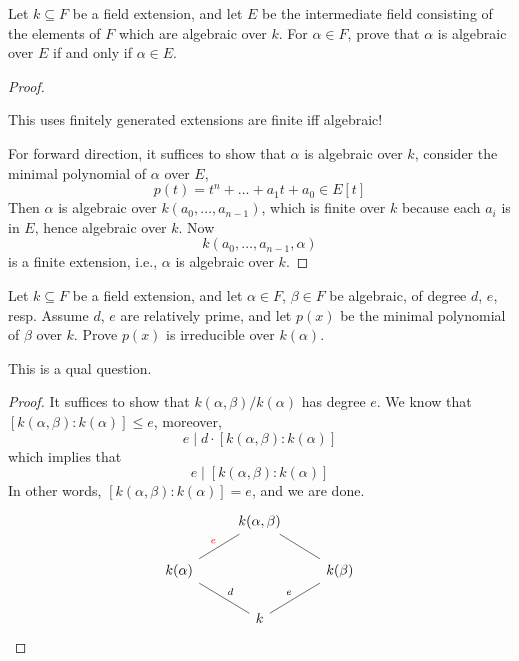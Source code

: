 \documentclass[openany]{book}
\begin{document}
\begin{prob}
Let \( k \subseteq F \) be a field extension, and let \( E \) be the intermediate field consisting of the elements of \( F \) which are algebraic over \( k \). For \( \alpha \in F \), prove that \( \alpha \) is algebraic over \( E \) if and only if \( \alpha \in E \). 
\end{prob}
\begin{proof}
    \begin{warn}
        This uses finitely generated extensions are finite iff algebraic!
    \end{warn}
    For forward direction, it suffices to show that $\alpha$ is algebraic over $k$, consider the minimal polynomial of $\alpha$ over $E$, 
    \begin{equation*}
        p(t)=t^n+\dots+a_1t+a_0\in E[t]
    \end{equation*}
    Then $\alpha$ is algebraic over $k(a_0,\dots, a_{n-1})$, which is finite over $k$ because each $a_i$ is in $E$, hence algebraic over $k$. Now 
    \begin{equation*}
        k(a_0,\dots, a_{n-1},\alpha)
    \end{equation*}
    is a finite extension, i.e., $\alpha$ is algebraic over $k$. 
\end{proof}


\begin{prob}
Let \( k \subseteq F \) be a field extension, and let \( \alpha \in F \), \( \beta \in F \) be algebraic, of degree \( d \), \( e \), resp. Assume \( d \), \( e \) are relatively prime, and let \( p(x) \) be the minimal polynomial of \( \beta \) over \( k \). Prove \( p(x) \) is irreducible over \( k(\alpha) \).
\end{prob}
\begin{warn}
    This is a qual question.
\end{warn}
\begin{proof}
    It suffices to show that $k(\alpha,\beta)/k(\alpha)$ has degree $e$. We know that $[k(\alpha,\beta):k(\alpha)]\leq e$, moreover, 
    \begin{equation*}
        e \mid d\cdot [k(\alpha,\beta):k(\alpha)]
    \end{equation*}
    which implies that 
    \begin{equation*}
        e \mid [k(\alpha,\beta):k(\alpha)]
    \end{equation*}
    In other words, $[k(\alpha,\beta):k(\alpha)]=e$, and we are done.
    \[\begin{tikzcd}
        & {k(\alpha, \beta)} \\
        {k(\alpha)} && {k(\beta)} \\
        & k
        \arrow["{\textcolor{red}{e}}", no head, from=2-1, to=1-2]
        \arrow[no head, from=2-3, to=1-2]
        \arrow["d"', no head, from=3-2, to=2-1]
        \arrow["e", no head, from=3-2, to=2-3]
    \end{tikzcd}\]
\end{proof}
\end{document}
